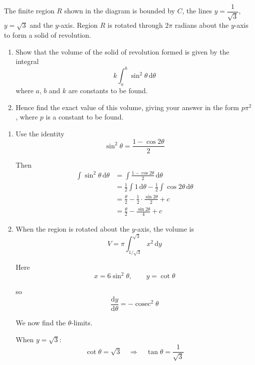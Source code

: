 \documentclass[leqno]{article}
\begin{document}
\begin{enumerate}[
  label=\textbf{\arabic*.},
  leftmargin=*,
  topsep=0pt,
  partopsep=0pt,
  parsep=0pt
]
The finite region $R$ shown in the diagram is bounded by $C$, the lines $y=\dfrac{1}{\sqrt{3}}$, $y=\sqrt{3}$ and the $y$-axis. Region $R$ is rotated through $2\pi$ radians about the $y$-axis to form a solid of revolution. \\
\begin{enumerate}[label=\textbf{(\alph*)}, resume]
  \item Show that the volume of the solid of revolution formed is given by the integral
  \[
  k\int_a^b \sin^2\theta\,\mathrm{d}\theta
  \]
  where $a$, $b$ and $k$ are constants to be found.  \\


\item Hence find the exact value of this volume, giving your answer in the form $p\pi^2$, where $p$ is a constant to be found.  \\
\end{enumerate}

\vspace*{10pt}

\begin{djsSolution}
\begin{enumerate}[label=\textbf{(\alph*)}]
  \item Use the identity
  \[
  \sin^2\theta=\frac{1-\cos 2\theta}{2}
  \]

  Then
  \begin{align*}
  \int \sin^2\theta\,\mathrm{d}\theta
  &= \int \frac{1-\cos 2\theta}{2}\,\mathrm{d}\theta \\
  &= \frac12\int 1\,\mathrm{d}\theta-\frac12\int \cos 2\theta\,\mathrm{d}\theta \\
  &= \frac{\theta}{2}-\frac12\cdot\frac{\sin 2\theta}{2}+c \\
  &= \frac{\theta}{2}-\frac{\sin 2\theta}{4}+c
  \end{align*}

  \item When the region is rotated about the $y$-axis, the volume is
  \[
  V=\pi\int_{1/\sqrt3}^{\sqrt3} x^2\,\mathrm{d}y
  \]

  Here
  \[
  x=6\sin^2\theta,\qquad y=\cot\theta
  \]

  so
  \[
  \frac{\mathrm{d}y}{\mathrm{d}\theta}=-\operatorname{cosec}^2\theta
  \]

  We now find the $\theta$-limits.

  When $y=\sqrt3$:
  \[
  \cot\theta=\sqrt3\quad\Longrightarrow\quad\tan\theta=\frac{1}{\sqrt3}
  \]


\end{enumerate}
\end{djsSolution}
\end{enumerate}
\end{document}
